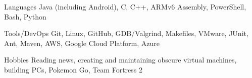 

\begin{cvskills}


  \cvskill
    {Languages} %
    {Java (including Android), C, C++, ARMv6 Assembly, PowerShell, Bash, Python} %
    
  \cvskill
    {Tools/DevOps} %
    {Git, Linux, GitHub, GDB/Valgrind, Makefiles, VMware, JUnit, Ant, Maven, AWS, Google Cloud Platform, Azure} %

  \cvskill
  {Hobbies} %
  {Reading news, creating and maintaining obscure virtual machines, building PCs, Pokemon Go, Team Fortress 2} %

\end{cvskills}
